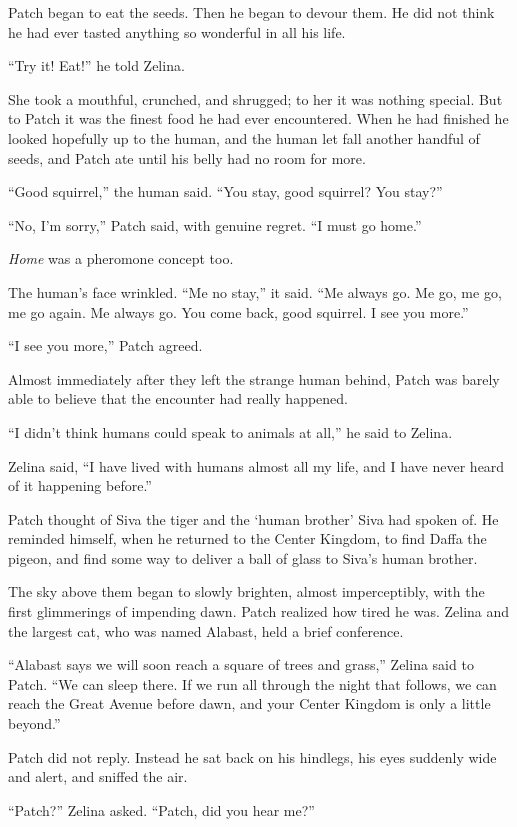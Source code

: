\documentclass[ebook,oneside,openany,17pt]{memoir}
\begin{document}
Patch began to eat the seeds. Then he began to devour them. He did not
think he had ever tasted anything so wonderful in all his life.

“Try it! Eat!” he told Zelina.

She took a mouthful, crunched, and shrugged; to her it was nothing
special. But to Patch it was the finest food he had ever
encountered. When he had finished he looked hopefully up to the human,
and the human let fall another handful of seeds, and Patch ate until
his belly had no room for more.

“Good squirrel,” the human said. “You stay, good squirrel? You stay?”

“No, I’m sorry,” Patch said, with genuine regret. “I must go home.”

\emph{Home} was a pheromone concept too.

The human’s face wrinkled. “Me no stay,” it said. “Me always go. Me
go, me go, me go again. Me always go. You come back, good squirrel. I
see you more.”

“I see you more,” Patch agreed.

Almost immediately after they left the strange human behind, Patch was
barely able to believe that the encounter had really happened.

“I didn’t think humans could speak to animals at all,” he said to
Zelina.

Zelina said, “I have lived with humans almost all my life, and I have
never heard of it happening before.”

Patch thought of Siva the tiger and the ‘human brother’ Siva had
spoken of. He reminded himself, when he returned to the Center
Kingdom, to find Daffa the pigeon, and find some way to deliver a ball
of glass to Siva’s human brother.

The sky above them began to slowly brighten, almost imperceptibly,
with the first glimmerings of impending dawn. Patch realized how tired
he was. Zelina and the largest cat, who was named Alabast, held a
brief conference.

“Alabast says we will soon reach a square of trees and grass,” Zelina
said to Patch. “We can sleep there. If we run all through the night
that follows, we can reach the Great Avenue before dawn, and your
Center Kingdom is only a little beyond.”

Patch did not reply. Instead he sat back on his hindlegs, his eyes
suddenly wide and alert, and snif\-fed the air.

“Patch?” Zelina asked. “Patch, did you hear me?”
\end{document}

